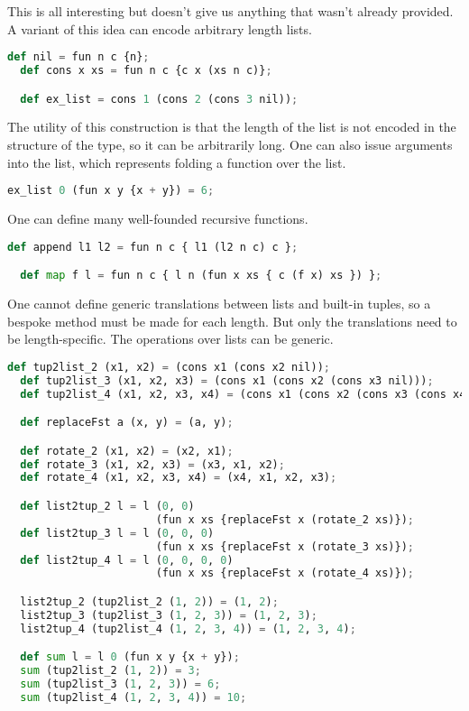 This is all interesting but doesn't give us anything that wasn't already provided. A variant of this idea can encode arbitrary length lists.

\begin{lstlisting}[language=Python]
  def nil = fun n c {n};
  def cons x xs = fun n c {c x (xs n c)};

  def ex_list = cons 1 (cons 2 (cons 3 nil));
\end{lstlisting}

The utility of this construction is that the length of the list is not encoded in the structure of the type, so it can be arbitrarily long. One can also issue arguments into the list, which represents folding a function over the list.

\begin{lstlisting}[language=Python]
  ex_list 0 (fun x y {x + y}) = 6;
\end{lstlisting}

One can define many well-founded recursive functions.

\begin{lstlisting}[language=Python]
  def append l1 l2 = fun n c { l1 (l2 n c) c };

  def map f l = fun n c { l n (fun x xs { c (f x) xs }) };
\end{lstlisting}

One cannot define generic translations between lists and built-in tuples, so a bespoke method must be made for each length. But only the translations need to be length-specific. The operations over lists can be generic.

\begin{lstlisting}[language=Python]
  def tup2list_2 (x1, x2) = (cons x1 (cons x2 nil));
  def tup2list_3 (x1, x2, x3) = (cons x1 (cons x2 (cons x3 nil)));
  def tup2list_4 (x1, x2, x3, x4) = (cons x1 (cons x2 (cons x3 (cons x4 nil))));

  def replaceFst a (x, y) = (a, y);

  def rotate_2 (x1, x2) = (x2, x1);
  def rotate_3 (x1, x2, x3) = (x3, x1, x2);
  def rotate_4 (x1, x2, x3, x4) = (x4, x1, x2, x3);

  def list2tup_2 l = l (0, 0) 
                       (fun x xs {replaceFst x (rotate_2 xs)});
  def list2tup_3 l = l (0, 0, 0) 
                       (fun x xs {replaceFst x (rotate_3 xs)});
  def list2tup_4 l = l (0, 0, 0, 0) 
                       (fun x xs {replaceFst x (rotate_4 xs)});

  list2tup_2 (tup2list_2 (1, 2)) = (1, 2);
  list2tup_3 (tup2list_3 (1, 2, 3)) = (1, 2, 3);
  list2tup_4 (tup2list_4 (1, 2, 3, 4)) = (1, 2, 3, 4);

  def sum l = l 0 (fun x y {x + y});
  sum (tup2list_2 (1, 2)) = 3;
  sum (tup2list_3 (1, 2, 3)) = 6;
  sum (tup2list_4 (1, 2, 3, 4)) = 10;
\end{lstlisting}

